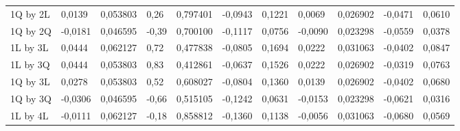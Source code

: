 \begin{table}[H]
{\begin{tabular}{lllllllllll}
\rowcolor[HTML]{FFFFFF} 
1Q by 2L       & {\color[HTML]{333333} 0,0139}   & {\color[HTML]{333333} 0,053803} & {\color[HTML]{333333} 0,26}     & {\color[HTML]{333333} 0,797401} & {\color[HTML]{333333} -0,0943}  & {\color[HTML]{333333} 0,1221}   & {\color[HTML]{333333} 0,0069}   & {\color[HTML]{333333} 0,026902} & {\color[HTML]{333333} -0,0471}  & {\color[HTML]{333333} 0,0610}   \\
\rowcolor[HTML]{FFFFFF} 
1Q by 2Q       & {\color[HTML]{333333} -0,0181}  & {\color[HTML]{333333} 0,046595} & {\color[HTML]{333333} -0,39}    & {\color[HTML]{333333} 0,700100} & {\color[HTML]{333333} -0,1117}  & {\color[HTML]{333333} 0,0756}   & {\color[HTML]{333333} -0,0090}  & {\color[HTML]{333333} 0,023298} & {\color[HTML]{333333} -0,0559}  & {\color[HTML]{333333} 0,0378}   \\
\rowcolor[HTML]{FFFFFF} 
1L by 3L       & {\color[HTML]{333333} 0,0444}   & {\color[HTML]{333333} 0,062127} & {\color[HTML]{333333} 0,72}     & {\color[HTML]{333333} 0,477838} & {\color[HTML]{333333} -0,0805}  & {\color[HTML]{333333} 0,1694}   & {\color[HTML]{333333} 0,0222}   & {\color[HTML]{333333} 0,031063} & {\color[HTML]{333333} -0,0402}  & {\color[HTML]{333333} 0,0847}   \\
\rowcolor[HTML]{FFFFFF} 
1L by 3Q       & {\color[HTML]{333333} 0,0444}   & {\color[HTML]{333333} 0,053803} & {\color[HTML]{333333} 0,83}     & {\color[HTML]{333333} 0,412861} & {\color[HTML]{333333} -0,0637}  & {\color[HTML]{333333} 0,1526}   & {\color[HTML]{333333} 0,0222}   & {\color[HTML]{333333} 0,026902} & {\color[HTML]{333333} -0,0319}  & {\color[HTML]{333333} 0,0763}   \\
\rowcolor[HTML]{FFFFFF} 
1Q by 3L       & {\color[HTML]{333333} 0,0278}   & {\color[HTML]{333333} 0,053803} & {\color[HTML]{333333} 0,52}     & {\color[HTML]{333333} 0,608027} & {\color[HTML]{333333} -0,0804}  & {\color[HTML]{333333} 0,1360}   & {\color[HTML]{333333} 0,0139}   & {\color[HTML]{333333} 0,026902} & {\color[HTML]{333333} -0,0402}  & {\color[HTML]{333333} 0,0680}   \\
\rowcolor[HTML]{FFFFFF} 
1Q by 3Q       & {\color[HTML]{333333} -0,0306}  & {\color[HTML]{333333} 0,046595} & {\color[HTML]{333333} -0,66}    & {\color[HTML]{333333} 0,515105} & {\color[HTML]{333333} -0,1242}  & {\color[HTML]{333333} 0,0631}   & {\color[HTML]{333333} -0,0153}  & {\color[HTML]{333333} 0,023298} & {\color[HTML]{333333} -0,0621}  & {\color[HTML]{333333} 0,0316}   \\
\rowcolor[HTML]{FFFFFF} 
1L by 4L       & {\color[HTML]{333333} -0,0111}  & {\color[HTML]{333333} 0,062127} & {\color[HTML]{333333} -0,18}    & {\color[HTML]{333333} 0,858812} & {\color[HTML]{333333} -0,1360}  & {\color[HTML]{333333} 0,1138}   & {\color[HTML]{333333} -0,0056}  & {\color[HTML]{333333} 0,031063} & {\color[HTML]{333333} -0,0680}  & {\color[HTML]{333333} 0,0569}   \\

\end{tabular}}
\end{table}
